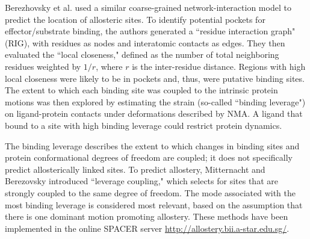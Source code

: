 \par Berezhovsky et al. used a similar coarse-grained network-interaction model to predict the location of allosteric sites.\cite{Berezovsky2013a} To identify potential pockets for effector/substrate binding, the authors generated a ``residue interaction graph" (RIG), with residues as nodes and interatomic contacts as edges. They then evaluated the ``local closeness," defined as the number of total neighboring residues weighted by $1/r$, where $r$ is the inter-residue distance.\cite{Mitternacht2011b} Regions with high local closeness were likely to be in pockets and, thus, were putative binding sites. The extent to which each binding site was coupled to the intrinsic protein motions was then explored by estimating the strain (so-called ``binding leverage") on ligand-protein contacts under deformations described by NMA. A ligand that bound to a site with high binding leverage could restrict protein dynamics.\cite{Mitternacht2011a}
\par The binding leverage describes the extent to which changes in binding sites and protein conformational degrees of freedom are coupled; it does not specifically predict allosterically linked sites. To predict allostery, Mitternacht and Berezovsky introduced ``leverage coupling," which selects for sites that are strongly coupled to the same degree of freedom.\cite{Mitternacht2011a} The mode associated with the most binding leverage is considered most relevant, based on the assumption that there is one dominant motion promoting allostery. These methods have been implemented in the online SPACER server \url{http://allostery.bii.a-star.edu.sg/}.\cite{Goncearenco2013a}
